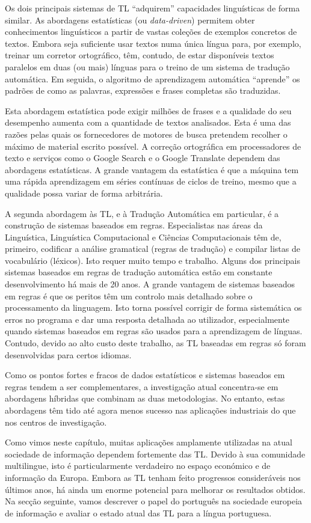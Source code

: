 \documentclass[]{../metanetpaper}
\begin{document}
\begin{multicols}{2}
Os dois principais sistemas de TL  “adquirem” capacidades linguísticas de forma similar. As abordagens estatísticas (ou \textit{data-driven}) permitem obter conhecimentos linguísticos a partir de vastas coleções de exemplos concretos de textos. Embora seja suficiente usar textos numa única língua para, por exemplo, treinar um corretor ortográfico, têm, contudo, de estar disponíveis textos paralelos em duas (ou mais) línguas para o treino de um sistema de tradução automática. Em seguida, o algoritmo de aprendizagem automática “aprende” os padrões de como as palavras, expressões e frases completas são traduzidas.

Esta abordagem estatística pode exigir milhões de frases e a qualidade do seu desempenho aumenta com a quantidade de textos analisados. Esta é uma das razões pelas quais os fornecedores de motores de busca pretendem recolher o máximo de material escrito possível. A correção ortográfica em processadores de texto e serviços como o Google Search e o Google Translate dependem das abordagens estatísticas. A grande vantagem da estatística é que a máquina tem uma rápida aprendizagem em séries contínuas de ciclos de treino, mesmo que a qualidade possa variar de forma arbitrária.

A segunda abordagem às TL, e à Tradução Automática em particular, é a construção de sistemas baseados em regras. Especialistas nas áreas da Linguística, Linguística Computacional e Ciências Computacionais têm de, primeiro, codificar a análise gramatical (regras de tradução) e compilar listas de vocabulário (léxicos). Isto requer muito tempo e trabalho. Alguns dos principais sistemas baseados em regras de tradução automática estão em constante desenvolvimento há mais de 20 anos. A grande vantagem de sistemas baseados em regras é que os peritos têm um controlo mais detalhado sobre o processamento da linguagem. Isto torna possível corrigir de forma sistemática os erros no programa e dar uma resposta detalhada ao utilizador, especialmente quando sistemas baseados em regras são usados para a aprendizagem de línguas. Contudo, devido ao alto custo deste trabalho, as TL baseadas em regras só foram desenvolvidas para certos idiomas.

Como os pontos fortes e fracos de dados estatísticos e sistemas baseados em regras tendem a ser complementares, a investigação atual concentra-se em abordagens híbridas que combinam as duas metodologias. No entanto, estas abordagens têm tido até agora menos sucesso nas aplicações industriais do que nos centros de investigação.

Como vimos neste capítulo, muitas aplicações amplamente utilizadas na atual sociedade de informação dependem fortemente das TL. Devido à sua comunidade multilingue, isto é particularmente verdadeiro no espaço económico e de informação da Europa. Embora as TL tenham feito progressos consideráveis nos últimos anos, há ainda um enorme potencial para melhorar os resultados obtidos. Na secção seguinte, vamos descrever o papel do português na sociedade europeia de informação e avaliar o estado atual das TL para a língua portuguesa.

\end{multicols}
\end{document}
